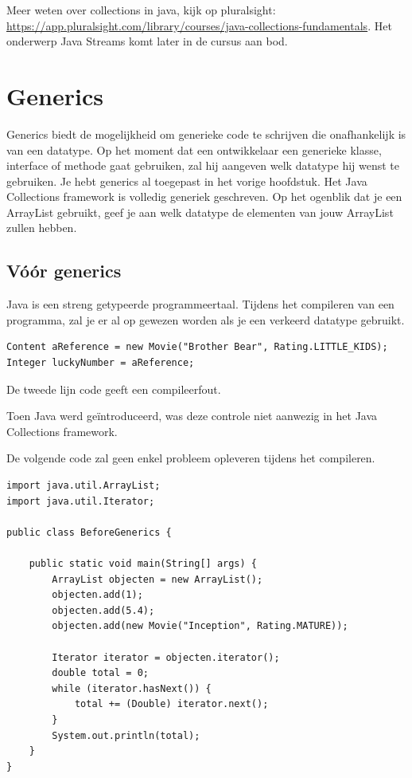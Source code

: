 \documentclass{tstextbook}
\begin{document}
\begin{remark}
  Meer weten over collections in java, kijk op pluralsight: \url{https://app.pluralsight.com/library/courses/java-collections-fundamentals}.
  Het onderwerp Java Streams komt later in de cursus aan bod.
\end{remark}

\chapter{Generics}

\begin{summary}
Generics biedt de mogelijkheid om generieke code te schrijven die onafhankelijk is van een datatype. Op het moment dat een ontwikkelaar een generieke klasse, interface of methode gaat gebruiken, zal hij aangeven welk datatype hij wenst te gebruiken. Je hebt generics al toegepast in het vorige hoofdstuk. Het Java Collections framework is volledig generiek geschreven. Op het ogenblik dat je een ArrayList gebruikt, geef je aan welk datatype de elementen van jouw ArrayList zullen hebben.
\end{summary}

\section{V\'o\'or generics}
Java is een streng getypeerde programmeertaal. Tijdens het compileren van een programma, zal je er al op gewezen worden als je een verkeerd datatype gebruikt.

\begin{lstlisting}
Content aReference = new Movie("Brother Bear", Rating.LITTLE_KIDS);
Integer luckyNumber = aReference;
\end{lstlisting}

De tweede lijn code geeft een compileerfout. 

Toen Java werd ge\"introduceerd, was deze controle niet aanwezig in het Java Collections framework. 

De volgende code zal geen enkel probleem opleveren tijdens het compileren.

\begin{lstlisting}
import java.util.ArrayList;
import java.util.Iterator;

public class BeforeGenerics {

	public static void main(String[] args) {
		ArrayList objecten = new ArrayList();
		objecten.add(1);
		objecten.add(5.4);
		objecten.add(new Movie("Inception", Rating.MATURE));

		Iterator iterator = objecten.iterator();
		double total = 0;
		while (iterator.hasNext()) {
			total += (Double) iterator.next();
		}
		System.out.println(total);
	}
}
\end{lstlisting}
\end{document}
